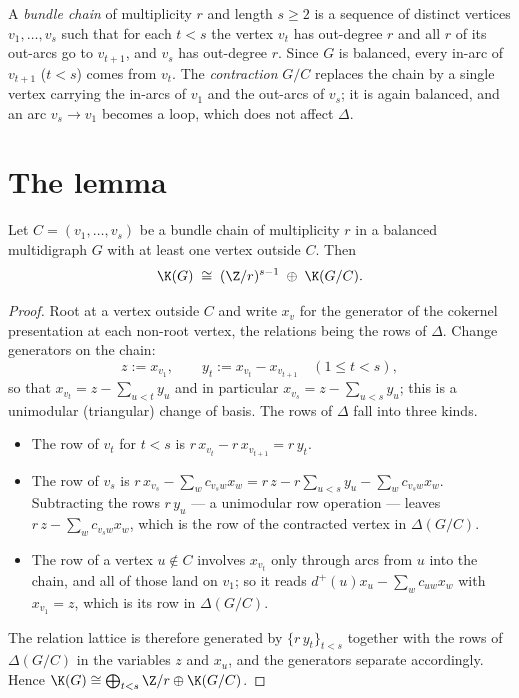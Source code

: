 \begin{definition}\label{Bio3:def:chain}
A \emph{bundle chain} of multiplicity $r$ and length $s\ge2$ is a sequence of distinct
vertices $v_1,\dots,v_s$ such that for each $t<s$ the vertex $v_t$ has out-degree $r$ and
all $r$ of its out-arcs go to $v_{t+1}$, and $v_s$ has out-degree $r$. Since $G$ is
balanced, every in-arc of $v_{t+1}$ ($t<s$) comes from $v_t$. The \emph{contraction}
$G/C$ replaces the chain by a single vertex carrying the in-arcs of $v_1$ and the
out-arcs of $v_s$; it is again balanced, and an arc $v_s\to v_1$ becomes a loop, which
does not affect $\Delta$.
\end{definition}

\section{The lemma}\label{Bio3:sec:lemma}

\begin{lemma}\label{Bio3:lem:bundle}
Let $C=(v_1,\dots,v_s)$ be a bundle chain of multiplicity $r$ in a balanced multidigraph
$G$ with at least one vertex outside $C$. Then
\[
\K(G)\;\cong\;(\Z/r)^{s-1}\;\oplus\;\K(G/C).
\]
\end{lemma}

\begin{proof}
Root at a vertex outside $C$ and write $x_v$ for the generator of the cokernel
presentation at each non-root vertex, the relations being the rows of $\Delta$. Change
generators on the chain:
\[
z:=x_{v_1},\qquad y_t:=x_{v_t}-x_{v_{t+1}}\quad(1\le t<s),
\]
so that $x_{v_t}=z-\sum_{u<t}y_u$ and in particular $x_{v_s}=z-\sum_{u<s}y_u$; this is a
unimodular (triangular) change of basis. The rows of $\Delta$ fall into three kinds.
\begin{itemize}
\item The row of $v_t$ for $t<s$ is $r\,x_{v_t}-r\,x_{v_{t+1}}=r\,y_t$.
\item The row of $v_s$ is $r\,x_{v_s}-\sum_w c_{v_sw}x_w
=r\,z-r\sum_{u<s}y_u-\sum_w c_{v_sw}x_w$. Subtracting the rows $r\,y_u$ --- a unimodular
row operation --- leaves $r\,z-\sum_w c_{v_sw}x_w$, which is the row of the contracted
vertex in $\Delta(G/C)$.
\item The row of a vertex $u\notin C$ involves $x_{v_t}$ only through arcs from $u$ into
the chain, and all of those land on $v_1$; so it reads $d^+(u)x_u-\sum_w c_{uw}x_w$ with
$x_{v_1}=z$, which is its row in $\Delta(G/C)$.
\end{itemize}
The relation lattice is therefore generated by $\{r\,y_t\}_{t<s}$ together with the rows
of $\Delta(G/C)$ in the variables $z$ and $x_u$, and the generators separate accordingly.
Hence $\K(G)\cong\bigoplus_{t<s}\Z/r\oplus\K(G/C)$.
\end{proof}

